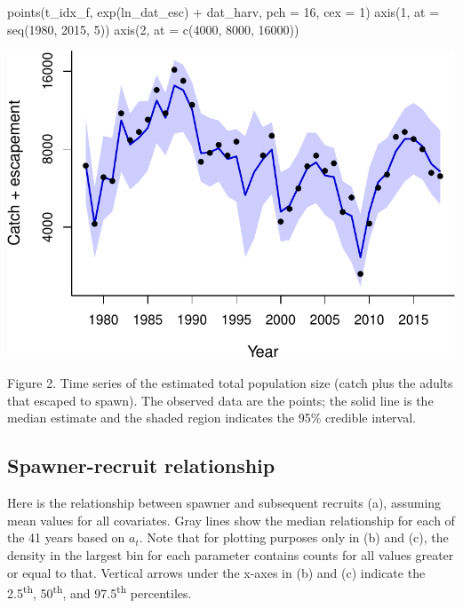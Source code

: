 \documentclass[11pt,]{article}
\newenvironment{Shaded}{}{}
\newcommand{\DataTypeTok}[1]{#1}
\newcommand{\DecValTok}[1]{#1}
\newcommand{\KeywordTok}[1]{\textcolor[rgb]{0.00,0.00,1.00}{#1}}
\newcommand{\NormalTok}[1]{#1}
\newcommand{\OperatorTok}[1]{#1}
\newcommand{\StringTok}[1]{\textcolor[rgb]{0.00,0.50,0.50}{#1}}
\begin{document}
\begin{Shaded}
\begin{Highlighting}[]
\KeywordTok{points}\NormalTok{(t_idx_f, }\KeywordTok{exp}\NormalTok{(ln_dat_esc) }\OperatorTok{+}\StringTok{ }\NormalTok{dat_harv, }\DataTypeTok{pch =} \DecValTok{16}\NormalTok{, }\DataTypeTok{cex =} \DecValTok{1}\NormalTok{)}
\KeywordTok{axis}\NormalTok{(}\DecValTok{1}\NormalTok{, }\DataTypeTok{at =} \KeywordTok{seq}\NormalTok{(}\DecValTok{1980}\NormalTok{, }\DecValTok{2015}\NormalTok{, }\DecValTok{5}\NormalTok{))}
\KeywordTok{axis}\NormalTok{(}\DecValTok{2}\NormalTok{, }\DataTypeTok{at =} \KeywordTok{c}\NormalTok{(}\DecValTok{4000}\NormalTok{, }\DecValTok{8000}\NormalTok{, }\DecValTok{16000}\NormalTok{))}
\end{Highlighting}
\end{Shaded}

\begin{center}\includegraphics{App_3_Summarize_results_files/figure-latex/fig_2_run_size-1} \end{center}

Figure 2. Time series of the estimated total population size (catch plus
the adults that escaped to spawn). The observed data are the points; the
solid line is the median estimate and the shaded region indicates the
95\% credible interval.

\hypertarget{spawner-recruit-relationship}{%
\subsection{Spawner-recruit
relationship}\label{spawner-recruit-relationship}}

Here is the relationship between spawner and subsequent recruits (a),
assuming mean values for all covariates. Gray lines show the median
relationship for each of the 41 years based on \(a_t\). Note that for
plotting purposes only in (b) and (c), the density in the largest bin
for each parameter contains counts for all values greater or equal to
that. Vertical arrows under the x-axes in (b) and (c) indicate the
2.5\textsuperscript{th}, 50\textsuperscript{th}, and
97.5\textsuperscript{th} percentiles.
\end{document}
